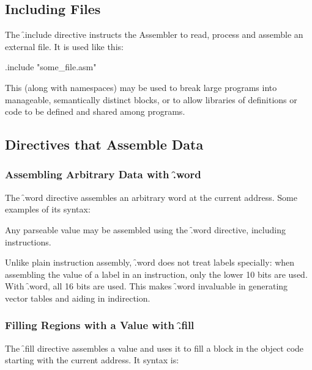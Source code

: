 \subsection{Including Files}

The \f{.include} directive instructs the Assembler to read, process and
assemble an external file. It is used like this:

\begin{cftasmcode}
.include "some_file.asm"
\end{cftasmcode}

This (along with namespaces) may be used to break large programs into
manageable, semantically distinct blocks, or to allow libraries of
definitions or code to be defined and shared among programs.


\subsection{Directives that Assemble Data}

\subsubsection{Assembling Arbitrary Data with \f{.word}}

The \f{.word} directive assembles an arbitrary word at the current
address. Some examples of its syntax:


Any parseable value may be assembled using the \f{.word} directive, including
instructions.

Unlike plain instruction assembly, \f{.word} does not treat labels specially:
when assembling the value of a label in an instruction, only the lower 10 bits
are used. With \f{.word}, all 16 bits are used. This makes \f{.word} invaluable
in generating vector tables and aiding in indirection.



\subsubsection{Filling Regions with a Value with \f{.fill}}

The \f{.fill} directive assembles a value and uses it to fill a block in the
object code starting with the current address. It syntax is:

